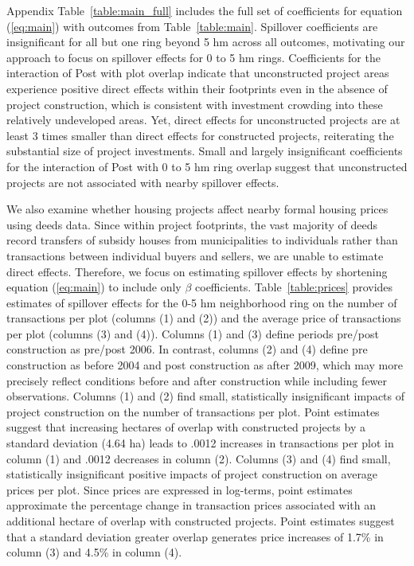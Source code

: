 \documentclass[12pt]{article}
\begin{document}
Appendix Table~\ref{table:main_full} includes the full set of coefficients for equation (\ref{eq:main}) with outcomes from  Table~\ref{table:main}.  Spillover coefficients are insignificant for all but one ring beyond 5 hm across all outcomes, motivating our approach to focus on spillover effects for 0 to 5 hm rings.  Coefficients for the interaction of Post with plot overlap indicate that unconstructed project areas experience positive direct effects within their footprints even in the absence of project construction, which is consistent with investment crowding into these relatively undeveloped areas.  Yet, direct effects for unconstructed projects are at least 3 times smaller than direct effects for constructed projects, reiterating the substantial size of project investments.  Small and largely insignificant coefficients for the interaction of Post with 0 to 5 hm ring overlap suggest that unconstructed projects are not associated with nearby spillover effects.  

We also examine whether housing projects affect nearby formal housing prices using deeds data.  Since within project footprints, the vast majority of deeds record transfers of subsidy houses from municipalities to individuals rather than transactions between individual buyers and sellers, we are unable to estimate direct effects.  Therefore, we focus on estimating spillover effects by shortening equation (\ref{eq:main}) to include only $\beta$ coefficients.  Table~\ref{table:prices} provides estimates of spillover effects for the 0-5 hm neighborhood ring on the number of transactions per plot (columns (1) and (2)) and the average price of transactions per plot (columns (3) and (4)).  Columns (1) and (3) define periods pre/post construction as pre/post 2006.  In contrast, columns (2) and (4) define pre construction as before 2004 and post construction as after 2009, which may more precisely reflect conditions before and after construction while including fewer observations.  Columns (1) and (2) find small, statistically insignificant impacts of project construction on the number of transactions per plot.  Point estimates suggest that increasing hectares of overlap with constructed projects by a standard deviation (4.64 ha) leads to .0012 increases in transactions per plot in column (1) and .0012 decreases in column (2).  Columns (3) and (4) find small, statistically insignificant positive impacts of project construction on average prices per plot.  Since prices are expressed in log-terms, point estimates approximate the percentage change in transaction prices associated with an additional hectare of overlap with constructed projects.  Point estimates suggest that a standard deviation greater overlap generates price increases of 1.7\% in column (3) and 4.5\% in column (4).  
\end{document}
